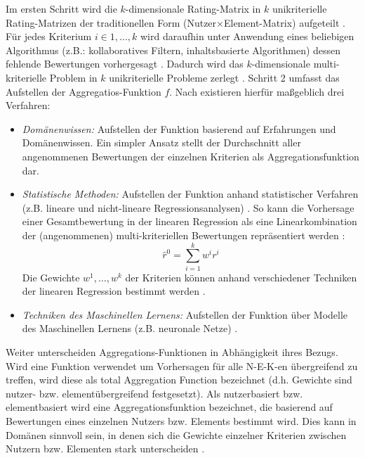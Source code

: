 Im ersten Schritt wird die $k$-dimensionale Rating-Matrix in $k$ unikriterielle Rating-Matrizen der traditionellen Form (Nutzer$\times$Element-Matrix) aufgeteilt \cite[S. 53]{adomavicius:inproceedings:2}.
Für jedes Kriterium $i \in {1,...,k}$ wird daraufhin unter Anwendung eines beliebigen Algorithmus (z.B.: kollaboratives Filtern, inhaltsbasierte Algorithmen) dessen fehlende Bewertungen vorhergesagt \cite[S. 428]{recommenderSystems:2016}.
Dadurch wird das $k$-dimensionale multi-kriterielle Problem in $k$ unikriterielle Probleme zerlegt \cite[S. 861]{adomavicius:4:inbook}.
Schritt 2 umfasst das Aufstellen der Aggregatios-Funktion $f$.
Nach \textcite[S. 53]{adomavicius:inproceedings:2} existieren hierfür maßgeblich drei Verfahren:
\begin{itemize}
    \item \textit{Domänenwissen:} Aufstellen der Funktion basierend auf Erfahrungen und Domänenwissen. Ein simpler Ansatz stellt der Durchschnitt aller angenommenen Bewertungen der einzelnen Kriterien als Aggregationsfunktion dar.
    \item \textit{Statistische Methoden:} Aufstellen der Funktion anhand statistischer Verfahren (z.B. lineare und nicht-lineare Regressionsanalysen) \cite[S. 53]{adomavicius:inproceedings:2}. So kann die Vorhersage einer Gesamtbewertung in der linearen Regression als eine Linearkombination der (angenommenen) multi-kriteriellen Bewertungen repräsentiert werden \cite[S. 429]{recommenderSystems:2016}:
    \begin{equation}\label{eq23}
        \hat{r}^{0} = \sum\limits_{i=1}^{k}w^{i} r^{i}
    \end{equation}
    Die Gewichte $w^{1}, ..., w^{k}$ der Kriterien können anhand verschiedener Techniken der linearen Regression bestimmt werden \cite[S. 429]{recommenderSystems:2016}.
    \item \textit{Techniken des Maschinellen Lernens:} Aufstellen der Funktion über Modelle des Maschinellen Lernens (z.B. neuronale Netze) \cite[S. 53]{adomavicius:inproceedings:2}.
\end{itemize}
Weiter unterscheiden \textcite[S. 53]{adomavicius:inproceedings:2} Aggregations-Funk\-tionen in Abhängigkeit ihres Bezugs.
Wird eine Funktion verwendet um Vorhersagen für alle \ac{N-E-K}-en übergreifend zu treffen, wird diese als total Aggregation Function bezeichnet (d.h. Gewichte sind nutzer- bzw. elementübergreifend festgesetzt).
Als nutzerbasiert bzw. elementbasiert wird eine Aggregationsfunktion bezeichnet, die basierend auf Bewertungen eines einzelnen Nutzers bzw. Elements bestimmt wird.
Dies kann in Domänen sinnvoll sein, in denen sich die Gewichte einzelner Kriterien zwischen Nutzern bzw. Elementen stark unterscheiden \cite[S. 53]{adomavicius:inproceedings:2}.

